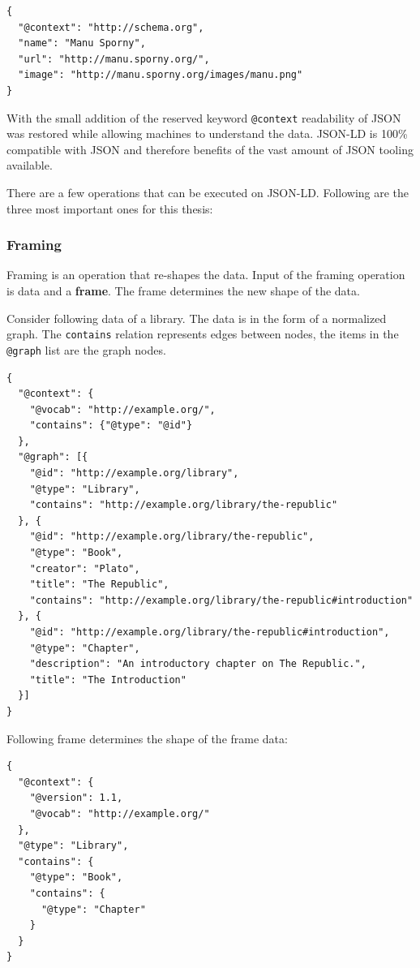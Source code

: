 \lstset{language=JSON}
\begin{lstlisting}[caption=Compacted data of a person, label=jsonldcompacted]
{
  "@context": "http://schema.org",
  "name": "Manu Sporny",
  "url": "http://manu.sporny.org/",
  "image": "http://manu.sporny.org/images/manu.png"
}
\end{lstlisting}

With the small addition of the reserved keyword \lstinline{@context} readability of JSON was restored while allowing machines to understand the data. JSON-LD is 100\% compatible with JSON and therefore benefits of the vast amount of JSON tooling available.

There are a few operations that can be executed on JSON-LD. Following are the three most important ones for this thesis:

\subsubsection{Framing}\label{jsonldframing}

Framing is an operation that re-shapes the data. Input of the framing operation is data and a \textbf{frame}. The frame determines the new shape of the data.

Consider following data of a library. The data is in the form of a normalized graph. The \lstinline{contains} relation represents edges between nodes, the items in the \lstinline{@graph} list are the graph nodes.

\lstset{language=JSON}
\begin{lstlisting}[caption=Data of a library as normalized graph]
{
  "@context": {
    "@vocab": "http://example.org/",
    "contains": {"@type": "@id"}
  },
  "@graph": [{
    "@id": "http://example.org/library",
    "@type": "Library",
    "contains": "http://example.org/library/the-republic"
  }, {
    "@id": "http://example.org/library/the-republic",
    "@type": "Book",
    "creator": "Plato",
    "title": "The Republic",
    "contains": "http://example.org/library/the-republic#introduction"
  }, {
    "@id": "http://example.org/library/the-republic#introduction",
    "@type": "Chapter",
    "description": "An introductory chapter on The Republic.",
    "title": "The Introduction"
  }]
}
\end{lstlisting}

Following frame determines the shape of the frame data:

\lstset{language=JSON}
\begin{lstlisting}[caption=Frame for the framing operation]
{
  "@context": {
    "@version": 1.1,
    "@vocab": "http://example.org/"
  },
  "@type": "Library",
  "contains": {
    "@type": "Book",
    "contains": {
      "@type": "Chapter"
    }
  }
}
\end{lstlisting}

